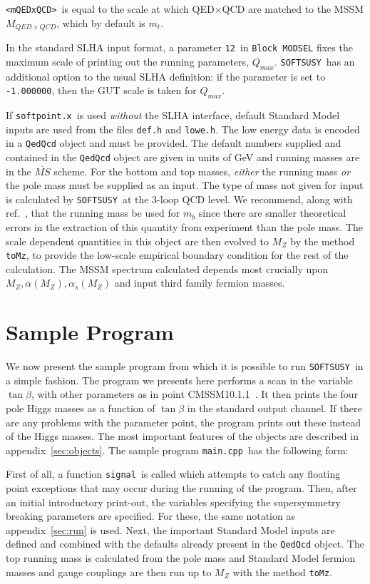 \documentclass{article}
\def\SOFTSUSY{{\tt SOFTSUSY}}
\def\code#1{\small{\tt #1}\normalsize}
\begin{document}
\code{<mQEDxQCD>}~is equal to the scale at which QED$\times$QCD are matched to
the MSSM  $M_{QED\times QCD}$, which by default is $m_t$. 

In the standard SLHA input format, a parameter 
\code{12}~in \code{Block MODSEL} fixes the maximum scale of printing out the
running parameters, $Q_{max}$. \SOFTSUSY~has an additional option to the usual SLHA
definition: if the parameter is set to \code{-1.000000}, then the GUT scale is
taken for $Q_{max}$.

If \code{softpoint.x}~is used {\em without}\/ the SLHA interface, default
Standard Model inputs are used from the files \code{def.h} and \code{lowe.h}.
The low energy data is encoded in a \code{QedQcd} object and must be
provided. 
The default numbers supplied and contained in the \code{QedQcd} object 
are given in units of
GeV and running masses are in the $\overline{MS}$ scheme. 
For the bottom and
top masses, {\em either}\/ the running mass {\em 
  or}\/ the pole mass must be supplied as an input. The type of mass not given
for input is  calculated
by \SOFTSUSY~at the 3-loop QCD level. We recommend, along with
ref.~\cite{bottomMass}, that the
running mass be used for $m_b$ since there are smaller theoretical errors in
the 
extraction of this quantity from experiment than the pole mass. 
The scale dependent quantities in this object are then evolved to $M_Z$ by 
the method \code{toMz}, to provide the low-scale empirical boundary condition
for the rest of the calculation. The MSSM spectrum calculated depends most
crucially upon $M_Z, \alpha(M_Z), \alpha_s(M_Z)$ and input third family
fermion masses.

\section{Sample Program \label{sec:prog}}
We now present the sample program from which it is possible to run
\SOFTSUSY~in a simple fashion. The program we presents here performs a scan in
the variable $\tan \beta$, with other parameters as in point
CMSSM10.1.1~\cite{bench}. 
It then prints the four pole Higgs masses as a function of $\tan \beta$ in the
standard output channel. If there are any problems with the parameter point,
the program prints out these instead of the Higgs masses.
The most important features of the objects are 
described in appendix~\ref{sec:objects}.
The sample program \code{main.cpp}~has the following form: 
\small

\normalsize
First of all, a function \code{signal}~is called which attempts to catch any floating point
exceptions that may occur during the running of the program. 
Then, after an initial introductory print-out, the variables specifying the
supersymmetry breaking parameters are specified. For these, the same notation
as appendix~\ref{sec:run} is used. Next, the important Standard Model inputs
are defined and combined with the defaults already present in the
\code{QedQcd} object. The top running mass is calculated from the pole mass
and 
Standard Model fermion masses and gauge couplings are
then run up to $M_Z$ with the method \code{toMz}.
\end{document}
